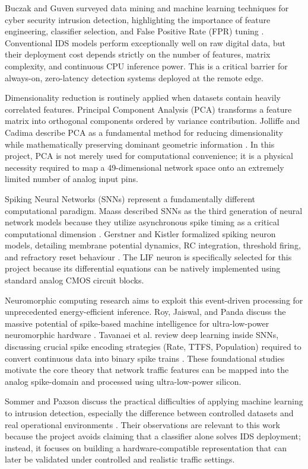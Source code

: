\documentclass{ieeeaccess}
\begin{document}
Buczak and Guven surveyed data mining and machine learning techniques for cyber security intrusion detection, highlighting the importance of feature engineering, classifier selection, and False Positive Rate (FPR) tuning \cite{Buczak2016}. Conventional IDS models perform exceptionally well on raw digital data, but their deployment cost depends strictly on the number of features, matrix complexity, and continuous CPU inference power. This is a critical barrier for always-on, zero-latency detection systems deployed at the remote edge.

Dimensionality reduction is routinely applied when datasets contain heavily correlated features. Principal Component Analysis (PCA) transforms a feature matrix into orthogonal components ordered by variance contribution. Jolliffe and Cadima describe PCA as a fundamental method for reducing dimensionality while mathematically preserving dominant geometric information \cite{Jolliffe2016}. In this project, PCA is not merely used for computational convenience; it is a physical necessity required to map a 49-dimensional network space onto an extremely limited number of analog input pins.

Spiking Neural Networks (SNNs) represent a fundamentally different computational paradigm. Maass described SNNs as the third generation of neural network models because they utilize asynchronous spike timing as a critical computational dimension \cite{Maass1997}. Gerstner and Kistler formalized spiking neuron models, detailing membrane potential dynamics, RC integration, threshold firing, and refractory reset behaviour \cite{Gerstner2002}. The LIF neuron is specifically selected for this project because its differential equations can be natively implemented using standard analog CMOS circuit blocks.

Neuromorphic computing research aims to exploit this event-driven processing for unprecedented energy-efficient inference. Roy, Jaiswal, and Panda discuss the massive potential of spike-based machine intelligence for ultra-low-power neuromorphic hardware \cite{Roy2019}. Tavanaei et al. review deep learning inside SNNs, discussing crucial spike encoding strategies (Rate, TTFS, Population) required to convert continuous data into binary spike trains \cite{Tavanaei2019}. These foundational studies motivate the core theory that network traffic features can be mapped into the analog spike-domain and processed using ultra-low-power silicon.

Sommer and Paxson discuss the practical difficulties of applying machine learning to intrusion detection, especially the difference between controlled datasets and real operational environments \cite{Sommer2010}. Their observations are relevant to this work because the project avoids claiming that a classifier alone solves IDS deployment; instead, it focuses on building a hardware-compatible representation that can later be validated under controlled and realistic traffic settings.
\end{document}
